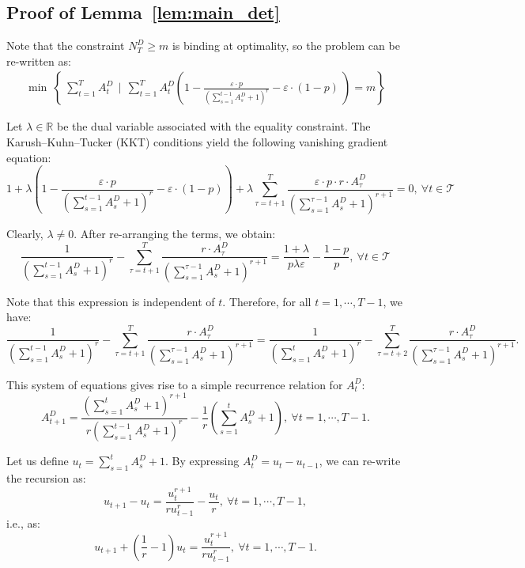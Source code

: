 \documentclass[nonblindrev]{informs3noheader}
\def\R{\mathbb{R}}
\def\calT{\mathcal{T}}
\begin{document}
\subsection{Proof of Lemma~\ref{lem:main_det}}

Note that the constraint $N^D_T\geq m$ is binding at optimality, so the problem can be re-written as:
\begin{align*}
    \min\ \left\{\ \sum_{t=1}^T A^D_t \ \ \bigg|\ \ \sum_{t=1}^TA^D_t \left(1 - \frac{\varepsilon\cdot p}{\left(\sum_{s=1}^{t-1} A^D_s +1\right)^r} - \varepsilon\cdot(1-p)\ \right)=m\right\}
\end{align*}

Let $\lambda\in\R$ be the dual variable associated with the equality constraint. The Karush–Kuhn–Tucker (KKT) conditions yield the following vanishing gradient equation:
$$1+\lambda\left(1 - \frac{\varepsilon\cdot p}{\left(\sum_{s=1}^{t-1} A^D_s +1\right)^r} - \varepsilon\cdot(1-p)\right)+\lambda\sum_{\tau=t+1}^T\frac{\varepsilon\cdot p\cdot r\cdot A^D_\tau}{\left(\sum_{s=1}^{\tau-1} A^D_s +1\right)^{r+1}}=0,\ \forall t\in\calT$$

Clearly, $\lambda\neq0$. After re-arranging the terms, we obtain:
$$\frac{1}{\left(\sum_{s=1}^{t-1} A^D_s +1\right)^r}-\sum_{\tau=t+1}^T\frac{r\cdot A^D_\tau}{\left(\sum_{s=1}^{\tau-1} A^D_s +1\right)^{r+1}}=\frac{1+\lambda}{p\lambda\varepsilon} - \frac{1-p}{p},\ \forall t\in\calT$$

Note that this expression is independent of $t$. Therefore, for all $t=1,\cdots,T-1$, we have:
$$\frac{1}{\left(\sum_{s=1}^{t-1} A^D_s +1\right)^r}-\sum_{\tau=t+1}^T\frac{ r\cdot A^D_\tau}{\left(\sum_{s=1}^{\tau-1} A^D_s +1\right)^{r+1}}=\frac{1}{\left(\sum_{s=1}^{t} A^D_s +1\right)^r}-\sum_{\tau=t+2}^T\frac{r\cdot A^D_\tau}{\left(\sum_{s=1}^{\tau-1} A^D_s +1\right)^{r+1}}.$$

This system of equations gives rise to a simple recurrence relation for $A^D_{t}$:
\begin{equation*}
    A^D_{t+1} = \frac{\left(\sum_{s=1}^{t} A^D_s +1\right)^{r+1}}{r\left(\sum_{s=1}^{t-1} A^D_s +1\right)^r} - \frac{1}{r}\left(\sum_{s=1}^{t} A^D_s +1\right),\ \forall t=1,\cdots,T-1.
\end{equation*}

Let us define $u_t = \sum_{s=1}^t A^D_s + 1$. By expressing $A^D_t=u_t-u_{t-1}$, we can re-write the recursion as:
\begin{equation*}
    u_{t+1} - u_t = \frac{u_t^{r+1}}{ru_{t-1}^r}-\frac{u_t}{r},\ \forall t=1,\cdots,T-1,
\end{equation*}
i.e., as:
\begin{equation}
    u_{t+1} + \left(\frac{1}{r}-1\right)u_t = \frac{u_t^{r+1}}{ru_{t-1}^r},\ \forall t=1,\cdots,T-1. \label{eq:recur_rel}
\end{equation}
\end{document}
